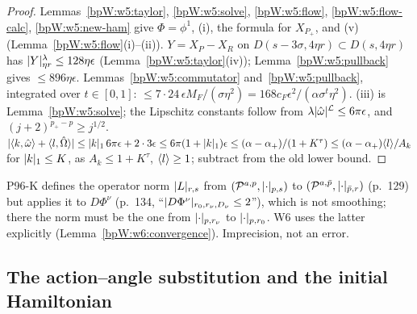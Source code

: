 \begin{proof}
\label{stepW:w5:st-con} Lemmas~\ref{bpW:w5:taylor}, \ref{bpW:w5:solve}, \ref{bpW:w5:flow},
\ref{bpW:w5:flow-calc}, \ref{bpW:w5:new-ham} give $\Phi=\phi^1$, (i), the formula for $X_{P_+}$, and (v)
(Lemma~\ref{bpW:w5:flow}(i)--(ii)).
\label{stepW:w5:st-1} $Y=X_P-X_R$ on $D(s-3\sigma,4\eta r)\subset D(s,4\eta r)$ has
$\lvert Y\rvert^\lambda_{\eta r}\le128\eta\epsilon$ (Lemma~\ref{bpW:w5:taylor}(iv)); Lemma~\ref{bpW:w5:pullback} gives $\le896\eta\epsilon$.
\label{stepW:w5:st-2} Lemmas~\ref{bpW:w5:commutator} and~\ref{bpW:w5:pullback}, integrated over
$t\in[0,1]$: $\le7\cdot24\,\epsilon M_F/(\sigma\eta^2)=168c_F\epsilon^2/(\alpha\sigma^t\eta^2)$.
\label{stepW:w5:st-freq} (iii) is Lemma~\ref{bpW:w5:solve}; the Lipschitz constants follow from
$\lambda\lvert \hat\omega\rvert^{\mathcal L}\le6\pi\epsilon$, and $(j+2)^{p_+-p}\ge j^{1/2}$.
\label{stepW:w5:st-div} $\lvert \langle k,\hat\omega\rangle+\langle l,\hat\Omega\rangle\rvert\le\lvert k\rvert_1\,6\pi\epsilon+2\cdot3\epsilon\le
6\pi(1+\lvert k\rvert_1)\epsilon\le(\alpha-\alpha_+)/(1+K^\tau)\le(\alpha-\alpha_+)\langle l\rangle/A_k$ for $\lvert k\rvert_1\le K$, as
$A_k\le1+K^\tau$, $\langle l\rangle\ge1$; subtract from the old lower bound.
\end{proof}

\begin{remark}\label{bpW:w5:notation}
P96-K defines the operator norm $\lvert L\rvert_{r,s}$ from $(\mathcal P^{a,p},\lvert \cdot\rvert_{p,s})$ to $(\mathcal P^{a,\bar p},\lvert \cdot\rvert_{\bar p,r})$
(p.~129) but applies it to $D\Phi^\nu$ (p.~134, ``$\lvert D\Phi^\nu\rvert_{r_0,r_\nu,D_\nu}\le2$''), which is not smoothing;
there the norm must be the one from $\lvert \cdot\rvert_{p,r_\nu}$ to $\lvert \cdot\rvert_{p,r_0}$. W6 uses the latter explicitly
(Lemma~\ref{bpW:w6:convergence}). Imprecision, not an error.
\end{remark}

\subsection{The action--angle substitution and the initial Hamiltonian}\label{bpW:w5:aa-sec}

